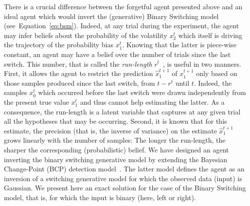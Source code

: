 \documentclass[10pt,letterpaper]{article}
\newcommand{\citep}[1]{\cite{#1}}
\newcommand{\seeEq}[1]{Equation~\ref{eq:#1}}
\newcommand{\AM}[1]{\textbf{\textcolor{blue}{[AM: #1]}}}
\begin{document}
There is a crucial difference between the forgetful agent presented above
and an ideal agent which would invert the (generative) Binary Switching model (see~\seeEq{bsm}).
Indeed, at any trial during the experiment,
the agent may infer beliefs about the probability of the volatility $x_2^t$
which itself is driving the trajectory of the probability bias $x_1^t$.
Knowing that the latter is piece-wise constant,
an agent may have a belief over the number of trials since the last switch.
This number, that is called the \emph{run-length} $r^t$~\citep{AdamsMackay2007}, is useful in two manners.
First, it allows the agent to restrict the prediction $\hat{x}_1^{t+1}$ of $x_1^{t+1}$
only based on those samples produced since the last switch, from $t-r^t$ until $t$.
Indeed, the samples $x_0^t$ which occurred before the last switch
were drawn independently from the present true value $x_1^t$
and thus cannot help estimating the latter.
As a consequence, the run-length is a latent variable 
that captures at any given trial all the hypotheses that may be occurring.
Second, it is known that for this estimate, the precision
(that is, the inverse of variance) on the estimate $\hat{x}_1^{t+1}$
grows linearly with the number of samples:
The longer the run-length, the sharper the corresponding (probabilistic) belief.
We have designed an agent inverting the binary switching generative model by extending
the Bayesian Change-Point (BCP) detection model~\citep{AdamsMackay2007}.
The latter model defines the agent as an inversion of a switching generative model
for which the observed data (input) is Gaussian.
We present here an exact solution for the case of the Binary Switching model,
that is, for which the input is binary (here, left or right). %
\end{document}
